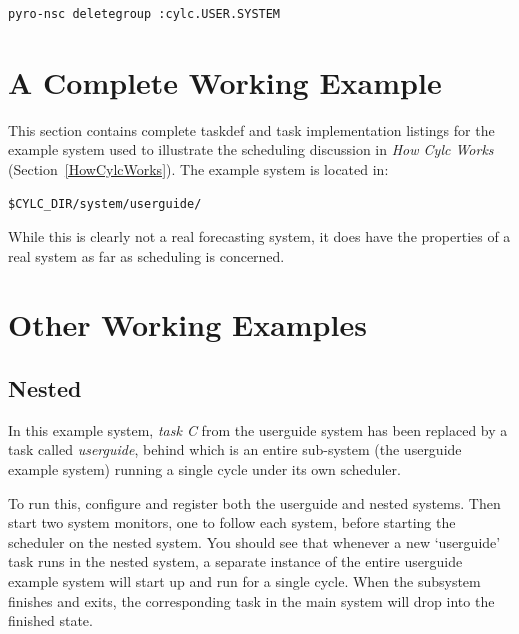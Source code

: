 \documentclass[11pt,a4paper]{article}
\begin{document}
\begin{lstlisting}
pyro-nsc deletegroup :cylc.USER.SYSTEM
\end{lstlisting}

\section{A Complete Working Example}
\label{ACompleteWorkingExample}

This section contains complete taskdef and task implementation listings
for the example system used to illustrate the scheduling discussion in
{\em How Cylc Works} (Section~\ref{HowCylcWorks}). The example system
is located in:

\begin{lstlisting}
$CYLC_DIR/system/userguide/
\end{lstlisting}

 While this is clearly not a real forecasting system, it does have the
 properties of a real system as far as scheduling is concerned.  




\pagebreak


\pagebreak
\section{Other Working Examples}
\label{OtherWorkingExamples}

\subsection{Nested}

In this example system, {\em task C} from the userguide system has been
replaced by a task called {\em userguide}, behind which is an entire
sub-system (the userguide example system) running a single cycle under
its own scheduler.

To run this, configure and register both the userguide and nested
systems. Then start two system monitors, one to follow each system,
before starting the scheduler on the nested system. You should see that 
whenever a new `userguide' task runs in the nested system, a separate
instance of the entire userguide example system will start up and run
for a single cycle. When the subsystem finishes and exits, the
corresponding task in the main system will drop into the finished state.
\end{document}

